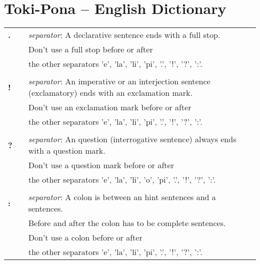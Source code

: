 \section{Toki-Pona -- English Dictionary}
\label{'dict'}
%
\begin{supertabular}{p{2,5cm}|ll}
    \textbf{.}                   &  & \textit{separator}: A declarative sentence ends with a full stop.                                          \\ && Don't use a full stop before or after \\ && the other separators 'e', 'la', 'li', 'pi', '.', '!', '?', ':'. \\
                                 &  &                                                                                                            \\ %
    \textbf{!}                   &  & \textit{separator}: An imperative or an interjection sentence (exclamatory) ends with an exclamation mark. \\ && Don't use an exclamation mark before or after \\ && the other separators 'e', 'la', 'li', 'pi', '.', '!', '?', ':'.  \\
                                 &  &                                                                                                            \\ %
    \textbf{?}                   &  & \textit{separator}: An question (interrogative sentence) always ends with a question mark.                 \\ && Don't use a question mark before or after \\ && the other separators 'e', 'la', 'li', 'o', 'pi', '.', '!', '?', ':'. \\
                                 &  &                                                                                                            \\ %
    \textbf{:}                   &  & \textit{separator}: A colon is between an hint sentences and a sentences.                                  \\  && Before and after the colon has to be complete sentences.  \\  && Don't use a colon before or after \\ && the other separators 'e', 'la', 'li', 'pi', '.', '!', '?', ':'.   \\

\end{supertabular}
